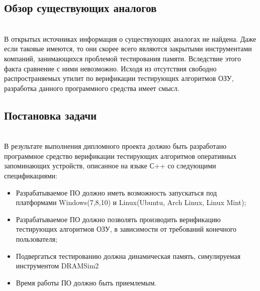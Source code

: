 \subsection{Обзор существующих аналогов}~\\
\label{page:domain:analogue}
В открытых источниках информация о существующих аналогах не найдена. Даже если таковые имеются, то они скорее всего являются закрытыми инструментами компаний, занимающихся проблемой тестирования памяти. Вследствие этого факта сравнение с ними невозможно. Исходя из отсутствия свободно распространяемых утилит по верификации тестирующих алгоритмов ОЗУ, разработка данного
программного средства имеет смысл.

\subsection{Постановка задачи}~\\
\label{page:domain:task}
В результате выполнения дипломного проекта должно быть разработано программное средство верификации тестирующих алгоритмов оперативных запоминающих устройств, описанное на языке С++ со следующими спецификациями:
\begin{itemize}
  \item Разрабатываемое ПО должно иметь возможность запускаться под платформами Windows(7,8,10) и Linux(Ubuntu, Arch Linux, Linux Mint);
  \item Разрабатываемое ПО должно позволять производить верификацию тестирующих алгоритмов ОЗУ, в зависимости от требований
конечного пользователя;
  \item Подвергаться тестированию должна динамическая память, симулируемая инструментом DRAMSim2
  \item Время работы ПО должно быть приемлемым.
\end{itemize}




